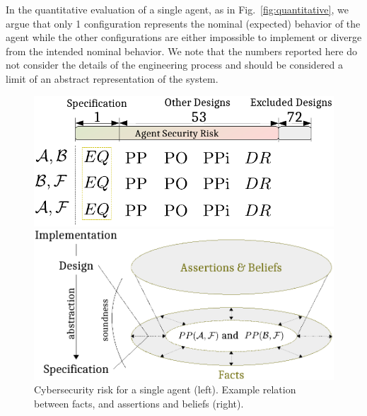 \documentclass[runningheads]{llncs}
\newcommand{\assertionRegion}{\mathcal{A}}
\newcommand{\beliefRegion}{\mathcal{B}}
\newcommand{\factRegion}{\mathcal{F}}
\begin{document}
In the quantitative evaluation of a single agent, as in Fig.~\ref{fig:quantitative},
we argue that only 1 configuration represents the nominal (expected) behavior 
of the agent while the other configurations are either impossible to 
implement or diverge from the intended nominal behavior. We note 
that the numbers reported here do not consider the details of the
engineering process and should be considered a limit of an abstract 
representation of the system.

\begin{figure}[t]
\begin{minipage}[t]{0.5\textwidth}
\includegraphics[width=.9\columnwidth]{quantitative.pdf}
\end{minipage}
\begin{minipage}[t]{0.5\textwidth}
\includegraphics[width=.9\columnwidth]{soundness.pdf}
\end{minipage}
  \caption{Cybersecurity risk for a single agent (left). Example relation between facts, and assertions and beliefs (right).}
\label{fig:quantitative}
\label{fig:soundness}
\end{figure}
\end{document}
